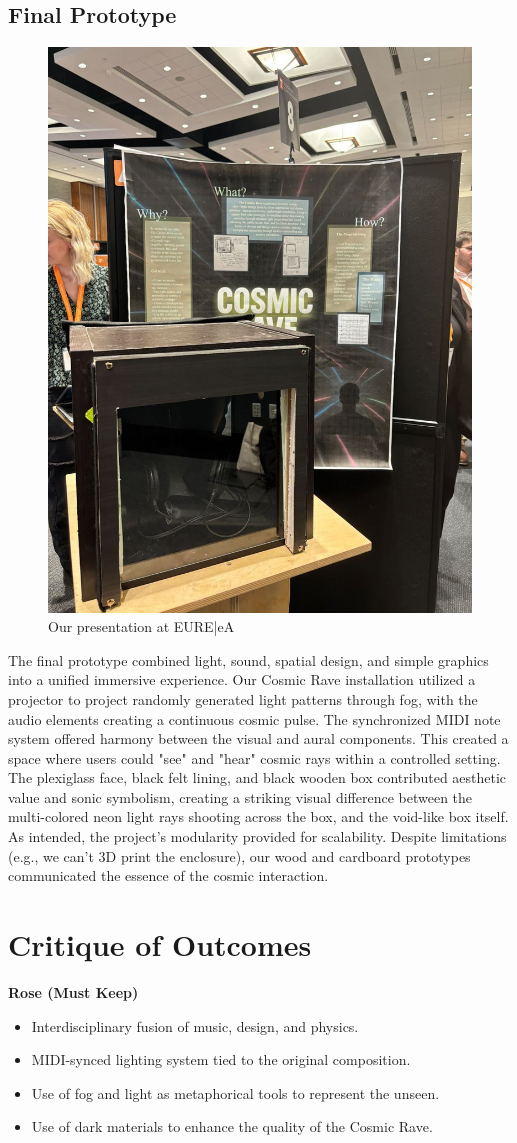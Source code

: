 \documentclass{article}
\begin{document}
\subsection{Final Prototype}
\begin{figure}
\begin{center}
    \includegraphics[width=.25\textwidth]{9}
    \caption{Our presentation at EURE\bar{e}A}
\end{center}
\end{figure}
The final prototype combined light, sound, spatial design, and simple graphics into a unified immersive experience. Our Cosmic Rave installation utilized a projector to project randomly generated light patterns through fog, with the audio elements creating a continuous cosmic pulse. The synchronized MIDI note system offered harmony between the visual and aural components. This created a space where users could "see" and "hear" cosmic rays within a controlled setting.
The plexiglass face, black felt lining, and black wooden box contributed aesthetic value and sonic symbolism, creating a striking visual difference between the multi-colored neon light rays shooting across the box, and the void-like box itself. As intended, the project's modularity provided for scalability. Despite limitations (e.g., we can't 3D print the enclosure), our wood and cardboard prototypes communicated the essence of the cosmic interaction.

\section{Critique of Outcomes}

\textbf{Rose (Must Keep)}
\begin{itemize}
    \item Interdisciplinary fusion of music, design, and physics.
    \item MIDI-synced lighting system tied to the original composition.
    \item Use of fog and light as metaphorical tools to represent the unseen.
    \item Use of dark materials to enhance the quality of the Cosmic Rave.
\end{itemize}
\end{document}
